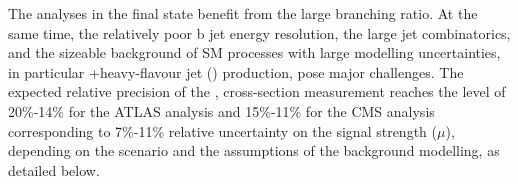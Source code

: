 
The \ttH analyses in the \Htobb final state benefit from the large branching ratio.
At the same time, the relatively poor b jet energy resolution, the large jet combinatorics, and the sizeable background of SM processes with large modelling uncertainties, in particular \ttbar+heavy-flavour jet (\ttHF) production, pose major challenges.
The expected relative precision of the \ttH, \Htobb cross-section measurement reaches the level of 20\%-14\% for the ATLAS analysis and 15\%-11\% for the CMS analysis ~\cite{ATLAS-PHYS-PUB-2018-XY,CMS-PAS-FTR-18-011} corresponding to 7\%-11\% relative uncertainty on the signal strength ($\mu$), depending on the scenario and the assumptions of the \ttHF background modelling, as detailed below.

